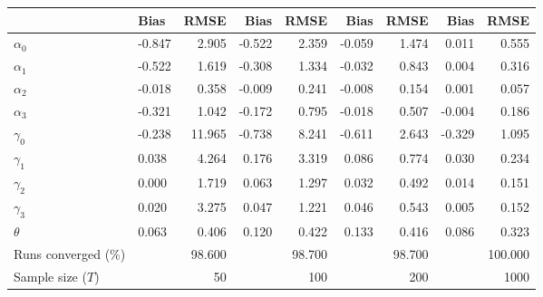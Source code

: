 
\begin{tabular}[t]{llrrrrrrr}
\toprule
  & Bias & RMSE & Bias & RMSE & Bias & RMSE & Bias & RMSE\\
\midrule
$\alpha_{0}$ & -0.847 & 2.905 & -0.522 & 2.359 & -0.059 & 1.474 & 0.011 & 0.555\\
$\alpha_{1}$ & -0.522 & 1.619 & -0.308 & 1.334 & -0.032 & 0.843 & 0.004 & 0.316\\
$\alpha_{2}$ & -0.018 & 0.358 & -0.009 & 0.241 & -0.008 & 0.154 & 0.001 & 0.057\\
$\alpha_{3}$ & -0.321 & 1.042 & -0.172 & 0.795 & -0.018 & 0.507 & -0.004 & 0.186\\
$\gamma_{0}$ & -0.238 & 11.965 & -0.738 & 8.241 & -0.611 & 2.643 & -0.329 & 1.095\\
$\gamma_{1}$ & 0.038 & 4.264 & 0.176 & 3.319 & 0.086 & 0.774 & 0.030 & 0.234\\
$\gamma_{2}$ & 0.000 & 1.719 & 0.063 & 1.297 & 0.032 & 0.492 & 0.014 & 0.151\\
$\gamma_{3}$ & 0.020 & 3.275 & 0.047 & 1.221 & 0.046 & 0.543 & 0.005 & 0.152\\
$\theta$ & 0.063 & 0.406 & 0.120 & 0.422 & 0.133 & 0.416 & 0.086 & 0.323\\
Runs converged (\%) &  & 98.600 &  & 98.700 &  & 98.700 &  & 100.000\\
Sample size ($T$) &  & 50 &  & 100 &  & 200 &  & 1000\\
\bottomrule
\end{tabular}
